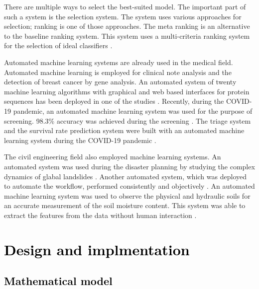 \documentclass[a4paper,fleqn]{cas-dc}
\newcommand{\responsemodsm}[1]{\textcolor{black}{#1}}
\newcommand{\sectionb}[1]{\section{\responsemodsm{#1}}}
\newcommand{\subsectionb}[1]{\subsection{\responsemodsm{#1}}}
\begin{document}
{    There are multiple ways to select the best-suited model. The important part of such a system is the selection system. The system uses various approaches for selection; ranking is one of those approaches. The meta ranking is an alternative to the baseline ranking system. This system uses a multi-criteria ranking system for the selection of ideal classifiers \cite{ref_paper_23}.
    
    Automated machine learning systems are already used in the medical field. Automated machine learning is employed for clinical note analysis \cite{ref_paper_a_2} and the detection of breast cancer \cite{ref_paper_a_6} by gene analysis. An automated system of twenty machine learning algorithms with graphical and web based interfaces for protein sequences has been deployed in one of the studies \cite{ref_paper_a_11}. Recently, during the COVID-19 pandemic, an automated machine learning system was used for the purpose of screening. 98.3\% accuracy was achieved during the screening \cite{ref_paper_a_15}. The triage system and the survival rate prediction system were built with an automated machine learning system during the COVID-19 pandemic \cite{ref_paper_a_9}.
    
    The civil engineering field also employed machine learning systems. An automated system was used during the disaster planning by studying the complex dynamics of glabal landslides \cite{ref_paper_a_10}. Another automated system, which was deployed to automate the workflow, performed consistently and objectively \cite{ref_paper_a_13}. An automated machine learning system was used to observe the physical and hydraulic soils for an accurate measurement of the soil moisture content. This system was able to extract the features from the data without human interaction \cite{ref_paper_a_8}.
}

\sectionb{Design and implmentation}\label{sec:design_and_implmentation}

\subsectionb{Mathematical model}\label{subsec:mathematical_model}
\end{document}
